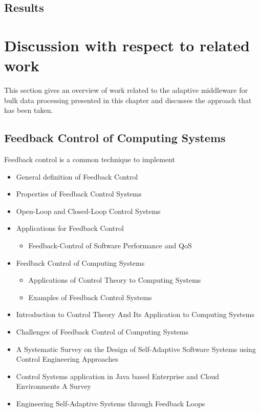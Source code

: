 \subsection{Results}

\section{Discussion with respect to related work}\label{sec:ch5_related_work}
This section gives an overview of work related to the adaptive middleware for bulk data processing presented in this chapter and discusses the approach that has been taken.

\subsection{Feedback Control of Computing Systems}

Feedback control is a common technique to implement 

\begin{itemize}
	\item General definition of Feedback Control
	\item Properties of Feedback Control Systems
	\item Open-Loop and Closed-Loop Control Systems
	\item Applications for Feedback Control
	\begin{itemize}
		\item Feedback-Control of Software Performance and \ac{QoS}
	\end{itemize}
\end{itemize}

\begin{itemize}
	\item Feedback Control of Computing Systems \citep{Hellerstein:2004a}
	\begin{itemize}
		\item Applications of Control Theory to Computing Systems
		\item Examples of Feedback Control Systems
	\end{itemize}
	\item Introduction to Control Theory And Its Application to Computing Systems \citep{Abdelzaher:2008ub}
	\item Challenges of Feedback Control of Computing Systems \citep{Hellerstein:2004tu}
	\item A Systematic Survey on the Design of Self-Adaptive Software Systems using Control Engineering Approaches \citep{Patikirikorala:2012ky}
	\item Control Systems application in Java based Enterprise and Cloud Environments \- A Survey \citep{Gullapalli:2011vn}
	\item Engineering Self-Adaptive Systems through Feedback Loops \citep{Brun:2009ww}
\end{itemize}

